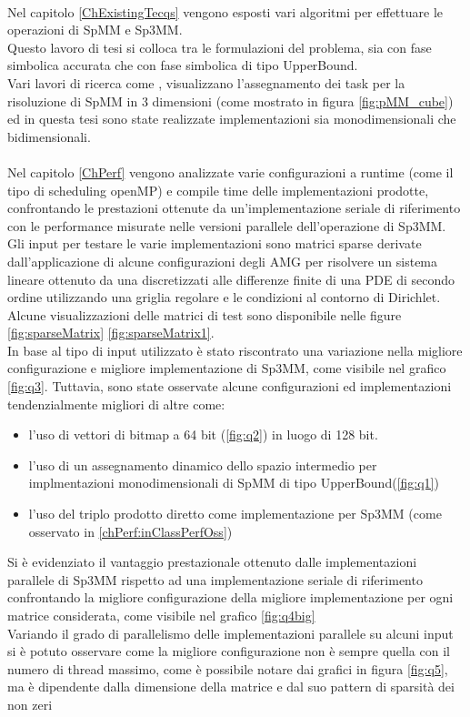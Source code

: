 \\
Nel capitolo \ref{ChExistingTecqs} vengono esposti vari algoritmi per effettuare le operazioni di SpMM e Sp3MM.\\
Questo lavoro di tesi si colloca tra le formulazioni \rowbyrow del problema, 
sia con fase simbolica accurata che con fase simbolica di tipo UpperBound.\\
Vari lavori di ricerca come \cite{cartesianPartitioningModels}, visualizzano 
l'assegnamento dei task per la risoluzione di SpMM in 3 dimensioni (come mostrato in figura \ref{fig:pMM_cube})
ed in questa tesi sono state realizzate implementazioni sia monodimensionali che bidimensionali.\\

\\
Nel capitolo \ref{ChPerf} vengono analizzate varie configurazioni a runtime (come il tipo di scheduling openMP) 
e compile time delle implementazioni prodotte,
confrontando le prestazioni ottenute da un'implementazione seriale di riferimento 
con le performance misurate nelle versioni parallele dell'operazione di Sp3MM.\\
Gli input per testare le varie implementazioni sono matrici sparse derivate dall'applicazione di 
alcune configurazioni degli AMG per risolvere un sistema lineare ottenuto da 
una discretizzati alle differenze finite di una PDE di secondo ordine
utilizzando una griglia regolare e le condizioni al contorno di Dirichlet.
Alcune visualizzazioni delle matrici di test sono disponibile nelle figure \ref{fig:sparseMatrix} \ref{fig:sparseMatrix1}.\\
In base al tipo di input utilizzato è stato riscontrato una variazione nella migliore configurazione e migliore implementazione
di Sp3MM, come visibile nel grafico \ref{fig:q3}.
Tuttavia, sono state osservate alcune configurazioni ed implementazioni tendenzialmente migliori di altre come:
\begin{itemize}
	\item	l'uso di vettori di bitmap a 64 bit (\ref{fig:q2}) in luogo di 128 bit.
	\item	l'uso di un assegnamento dinamico dello spazio intermedio per implmentazioni monodimensionali di SpMM di tipo UpperBound(\ref{fig:q1})
	\item	l'uso del triplo prodotto diretto come implementazione per Sp3MM (come osservato in \ref{chPerf:inClassPerfOss})
\end{itemize}
Si è evidenziato il vantaggio prestazionale ottenuto dalle implementazioni parallele di Sp3MM rispetto ad una 
implementazione seriale di riferimento confrontando la migliore configurazione della migliore implementazione 
per ogni matrice considerata, come visibile nel grafico \ref{fig:q4big}\\
Variando il grado di parallelismo delle implementazioni parallele su alcuni input si è potuto
osservare come la migliore configurazione non è sempre quella con il numero di thread massimo, 
come è possibile notare dai grafici in figura \ref{fig:q5},
ma è dipendente dalla dimensione della matrice e dal suo pattern di sparsità dei non zeri
